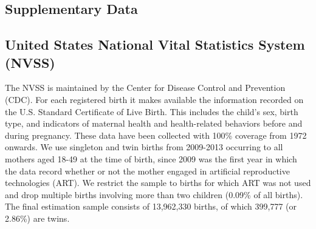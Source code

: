 \documentclass{nature}
\begin{document}
\begin{linenumbers}

\section{Supplementary Data}
\subsection{United States National Vital Statistics System (NVSS)}
The NVSS is maintained by the Center for Disease Control and Prevention (CDC). %
For each registered birth it makes available the information recorded on the U.S. Standard Certificate of Live Birth. This includes the child's sex, birth type, and indicators of maternal health and health-related behaviors before and during pregnancy. These data have been collected with 100\% coverage from 1972 onwards. We use singleton and twin births from 2009-2013\cite{Martinetal2013} occurring to all mothers aged 18-49 at the time of birth, since 2009 was the first year in which the data record whether or not the mother engaged in artificial reproductive technologies (ART).%
We restrict the sample to births for which ART was not used and drop multiple births involving more than two children (0.09\% of all births). The final estimation sample consists of 13,962,330 births, of which 399,777 (or 2.86\%) are twins.
  

\end{linenumbers}
\end{document}
